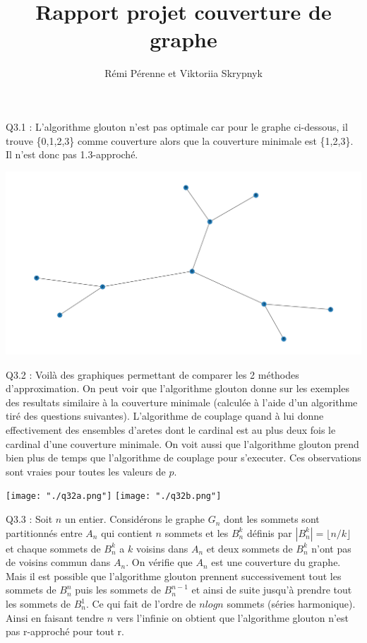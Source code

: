 \documentclass[a4paper]{article}
\begin{document}
\title{Rapport projet couverture de graphe}
\author{Rémi Pérenne et Viktoriia Skrypnyk}
\maketitle

Q3.1 :
L'algorithme glouton n'est pas optimale car pour le graphe ci-dessous, il trouve \{0,1,2,3\} comme couverture alors que la couverture minimale est \{1,2,3\}. Il n'est donc pas 1.3-approché.

\includegraphics{"./graphe_q31.png"}

Q3.2 :
Voilà des graphiques permettant de comparer les 2 méthodes d'approximation. On peut voir que l'algorithme glouton donne sur les exemples des resultats similaire à la couverture minimale (calculée à l'aide d'un algorithme tiré des questions suivantes). L'algorithme de couplage quand à lui donne effectivement des ensembles d'aretes dont le cardinal est au plus deux fois le cardinal d'une couverture minimale. On voit aussi que l'algorithme glouton prend bien plus de temps que l'algorithme de couplage pour s'executer. Ces observations sont vraies pour toutes les valeurs de $p$.

\texttt{[image: "./q32a.png"]}
\texttt{[image: "./q32b.png"]}

Q3.3 :
Soit $n$ un entier. Considérons le graphe $G_n$ dont les sommets sont partitionnés entre $A_n$ qui contient $n$ sommets et les $B_n^k$ définis par $|B_n^k| = \lfloor n/k \rfloor $ et chaque sommets de $B_n^k$ a $k$ voisins dans $A_n$ et deux sommets de $B_n^k$ n'ont pas de voisins commun dans $A_n$. On vérifie que $A_n$ est une couverture du graphe. Mais il est possible que l'algorithme glouton prennent successivement tout les sommets de $B_n^n$ puis les sommets de $B_n^{n-1}$ et ainsi de suite jusqu'à prendre tout les sommets de $B_n^1$. Ce qui fait de l'ordre de $nlogn$ sommets (séries harmonique). Ainsi en faisant tendre $n$ vers l'infinie on obtient que l'algorithme glouton n'est pas r-approché pour tout r.
\\
\end{document}
